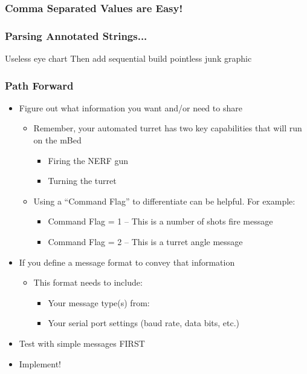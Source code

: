 \documentclass[aspectratio=169]{beamer}
\newcommand{\myroot}{../..}
\begin{document}
\begin{frame}
\frametitle{Comma Separated Values are Easy!}
\begin{center}

\end{center}
\end{frame}

\begin{frame}
\frametitle{Parsing Annotated Strings...}
Useless eye chart 
Then add sequential build pointless junk graphic
\end{frame}

\begin{frame}
\frametitle{Path Forward}
\begin{itemize}
\item Figure out what information you want and/or need to share
\begin{itemize}
\item Remember, your automated turret has two key capabilities that will run on the mBed
\begin{itemize}
\item Firing the NERF gun
\item Turning the turret
\end{itemize}
\item Using a ``Command Flag'' to differentiate can be helpful. For example:
\begin{itemize}
\item Command Flag = 1 – This is a number of shots fire message
\item Command Flag = 2 – This is a turret angle message
\end{itemize}
\end{itemize}
\item If you define a message format to convey that information
\begin{itemize}
\item This format needs to include:
\begin{itemize}
\item Your message type(s) from:
\item Your serial port settings (baud rate, data bits, etc.)
\end{itemize}
\end{itemize}
\item Test with simple messages FIRST
\item Implement!
\end{itemize}
\end{frame}
\end{document}

